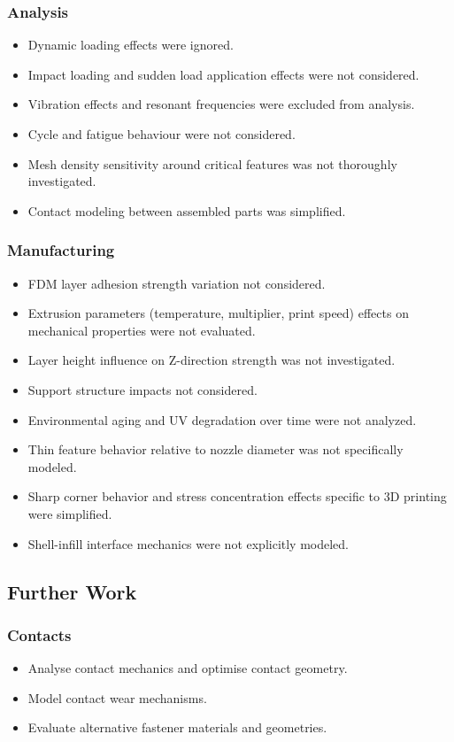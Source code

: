 \documentclass[10pt]{article}
\begin{document}
\subsubsection{Analysis}
\begin{itemize}[leftmargin=*]
	\item Dynamic loading effects were ignored.
	\item Impact loading and sudden load application effects were not considered.
	\item Vibration effects and resonant frequencies were excluded from analysis.
	\item Cycle and fatigue behaviour were not considered.
	\item Mesh density sensitivity around critical features was not thoroughly investigated.
	\item Contact modeling between assembled parts was simplified.
\end{itemize}

\subsubsection{Manufacturing}
\begin{itemize}[leftmargin=*]
	\item FDM layer adhesion strength variation not considered.
	\item Extrusion parameters (temperature, multiplier, print speed) effects on mechanical properties were
	      not evaluated.
	\item Layer height influence on Z-direction strength was not investigated.
	\item Support structure impacts not considered.
	\item Environmental aging and UV degradation over time were not analyzed.
	\item Thin feature behavior relative to nozzle diameter was not specifically modeled.
	\item Sharp corner behavior and stress concentration effects specific to 3D printing were simplified.
	\item Shell-infill interface mechanics were not explicitly modeled.
\end{itemize}

\subsection{Further Work}
\subsubsection{Contacts}
\begin{itemize}[leftmargin=*]
	\item Analyse contact mechanics and optimise contact geometry.
	\item Model contact wear mechanisms.
	\item Evaluate alternative fastener materials and geometries.
\end{itemize}
\end{document}
